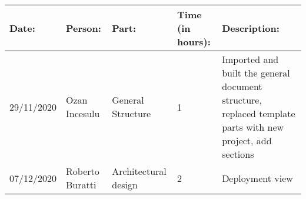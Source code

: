 \begin{table}[h]
    \begin{tabular}{|p{2cm}|p{2cm}|p{2cm}|p{1.5cm}|p{8cm}|}
        \hline
        Date:      & Person:         & Part:                & Time (in hours):  & Description:                                       \\ \hline
        29/11/2020 & Ozan Incesulu   & General Structure    & 1                 & Imported and built the general document structure, replaced template parts with new project, add sections\\ \hline
        07/12/2020 & Roberto Buratti & Architectural design & 2                 & Deployment view\\ \hline
    \end{tabular}
\end{table}
